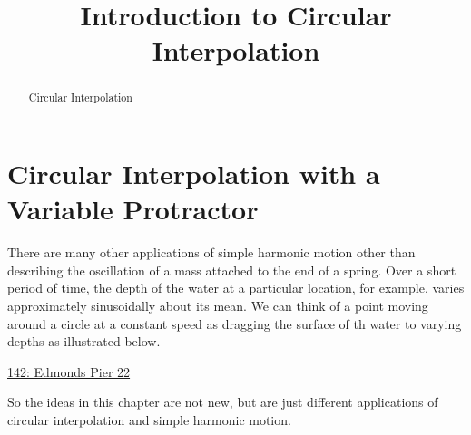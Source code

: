 \documentclass{ximera}
\title{Introduction to Circular Interpolation}
\begin{document}
\begin{abstract}
Circular Interpolation
\end{abstract}
\maketitle

\section{Circular Interpolation with a Variable Protractor}

There are many other applications of simple harmonic motion other than describing the oscillation of a mass attached to the end of a spring. Over a short period of time, the depth of the water at a particular location, for example, varies approximately sinusoidally about its mean. We can think of a point moving around a circle at a constant speed as dragging the surface of th water to varying depths as illustrated below.  

\begin{onlineOnly}
    \begin{center}
\end{center}
\end{onlineOnly}

\href{https://www.desmos.com/calculator/enxgzmsxri}{142: Edmonds Pier 22}

So the ideas in this chapter are not new, but are just different applications of circular interpolation and simple harmonic motion.
\end{document}
